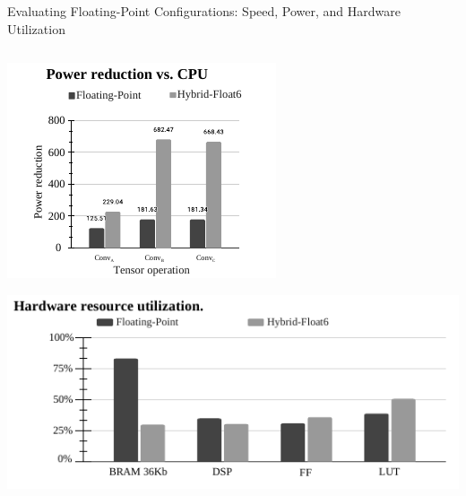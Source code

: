 \begin{frame}{Evaluating Floating-Point Configurations: Speed, Power, and Hardware Utilization}
\begin{columns}[T]
\begin{column}{0.5\textwidth}
			\includegraphics[width=0.5\linewidth]{slides/figures/power_reduction_vs_cpu.pdf} %
			\pause %
			
			\includegraphics[width=0.8\linewidth]{slides/figures/resource_utilization.pdf} %
		\end{column}
	\end{columns}
\end{frame}


